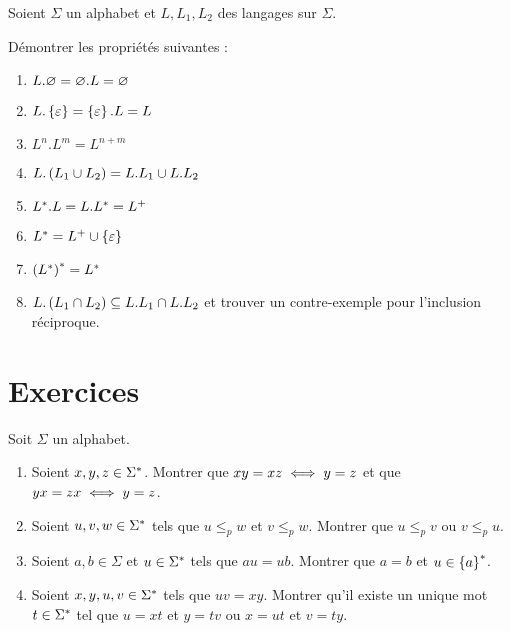 \begin{corr}
\end{corr}

\begin{exo}
Soient \(\Sigma\) un alphabet et \(L,L_1,L_2\) des langages sur \(\Sigma\).

Démontrer les propriétés suivantes :

\begin{enumerate}
    \item \(L.\varnothing=\varnothing.L=\varnothing\) \\
    \item \(L.\left\lbrace\varepsilon\right\rbrace=\left\lbrace\varepsilon\right\rbrace.L=L\) \\
    \item \(L^n.L^m=L^{n+m}\) \\
    \item \(L.\left(L_1\cup L_2\right)=L.L_1\cup L.L_2\) \\
    \item \(L^{*}.L=L.L^{*}=L^+\) \\
    \item \(L^{*}=L^+\cup\left\lbrace\varepsilon\right\rbrace\) \\
    \item \(\left(L^{*}\right)^{*}=L^{*}\) \\
    \item \(L.\left(L_1\cap L_2\right)\subseteq L.L_1\cap L.L_2\) et trouver un contre-exemple pour l'inclusion réciproque.
\end{enumerate}
\end{exo}

\begin{corr}
\end{corr}

\section*{Exercices}

\begin{exo}
Soit \(\Sigma\) un alphabet.

\begin{enumerate}
    \item Soient \(x,y,z\in\Sigma^{*}\). Montrer que \(xy=xz\iff y=z\) et que \(yx=zx\iff y=z\). \\
    \item Soient \(u,v,w\in\Sigma^{*}\) tels que \(u\leq_pw\) et \(v\leq_pw\). Montrer que \(u\leq_pv\) ou \(v\leq_pu\). \\
    \item Soient \(a,b\in\Sigma\) et \(u\in\Sigma^{*}\) tels que \(au=ub\). Montrer que \(a=b\) et \(u\in\left\lbrace a\right\rbrace^{*}\). \\
    \item Soient \(x,y,u,v\in\Sigma^{*}\) tels que \(uv=xy\). Montrer qu'il existe un unique mot \(t\in\Sigma^{*}\) tel que \(u=xt\) et \(y=tv\) ou \(x=ut\) et \(v=ty\).
\end{enumerate}
\end{exo}

